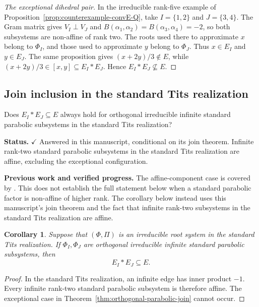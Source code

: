 \documentclass[11pt,reqno]{amsart}
\theoremstyle{plain}
\newtheorem{corollary}[theorem]{Corollary}
\theoremstyle{definition}
\theoremstyle{remark}
\numberwithin{equation}{section}
\begin{document}
\begin{proof}[The exceptional dihedral pair]
In the irreducible rank-five example of
Proposition~\ref{prop:counterexample-convE-Q}, take $I=\{1,2\}$ and
$J=\{3,4\}$. The Gram matrix gives $V_I\perp V_J$ and
$B(\alpha_1,\alpha_2)=B(\alpha_3,\alpha_4)=-2$, so both subsystems
are non-affine of rank two. The roots used there to approximate $x$
belong to $\Phi_I$, and those used to approximate $y$ belong to
$\Phi_J$. Thus $x\in E_I$ and $y\in E_J$. The same proposition gives
$(x+2y)/3\notin E$, while $(x+2y)/3\in[x,y]\subseteq E_I*E_J$.
Hence $E_I*E_J\not\subseteq E$.
\end{proof}

\subsection{Join inclusion in the standard Tits realization}

Does $E_I*E_J\subseteq E$ always hold for orthogonal irreducible
infinite standard parabolic subsystems in the standard Tits realization?


\par\medskip
\noindent\textbf{Status.} \(\checkmark\) Answered in this manuscript, conditional on its join theorem. Infinite rank-two standard parabolic subsystems in the standard Tits realization are affine, excluding the exceptional configuration.

\par\medskip
\noindent\textbf{Previous work and verified progress.}
The affine-component case is covered by
\cite[Proposition~5.30]{FRX2026}. This does not establish the full statement
below when a standard parabolic factor is non-affine of higher rank.
The corollary below instead uses this manuscript's join theorem and
the fact that infinite rank-two subsystems in the standard Tits
realization are affine.

\begin{corollary}\label{cor:standard-tits-join}
Suppose that $(\Phi,\Pi)$ is an irreducible root system in the
standard Tits realization. If $\Phi_I,\Phi_J$ are orthogonal
irreducible infinite standard parabolic subsystems, then
\[
E_I*E_J\subseteq E.
\]
\end{corollary}

\begin{proof}
In the standard Tits realization, an infinite edge has inner
product $-1$. Every infinite rank-two standard parabolic
subsystem is therefore affine. The exceptional case in
Theorem~\ref{thm:orthogonal-parabolic-join} cannot occur.
\end{proof}
\end{document}
